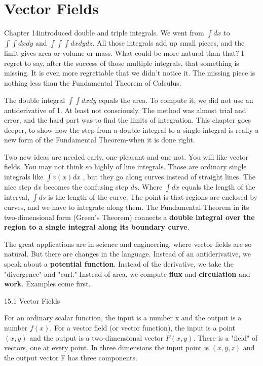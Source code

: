 \section{Vector Fields}\label{sec:vector_fields}
Chapter 14introduced double and triple integrals. We went from $\int dx$ to $\int \int  dx dy$ and
$\int \int \int dx dy dz$. All those integrals add up small pieces, and the limit gives area or volume
or mass. What could be more natural than that? I regret to say, after the success of
those multiple integrals, that something is missing. It is even more regrettable that
we didn't notice it. The missing piece is nothing less than the Fundamental Theorem
of Calculus.

The double integral $\int \int dx dy$ equals the area. To compute it, we did not use an
antiderivative of 1. At least not consciously. The method was almost trial and error,
and the hard part was to find the limits of integration. This chapter goes deeper, to
show how the step from a double integral to a single integral is really a new form of
the Fundamental Theorem-when it is done right.

Two new ideas are needed early, one pleasant and one not. You will like vector
fields. You may not think so highly of line integrals. Those are ordinary single integrals
like $\int v(x) dx$ , but they go along curves instead of straight lines. The nice step $dx$
becomes the confusing step $ds$. Where $\int dx$ equals the length of the interval, $\int  ds$ is
the length of the curve. The point is that regions are enclosed by curves, and we have
to integrate along them. The Fundamental Theorem in its two-dimensional form
(Green's Theorem) connects a \textbf{double integral over the region to a single integral along
its boundary curve}.

The great applications are in science and engineering, where vector fields are so
natural. But there are changes in the language. Instead of an antiderivative, we speak
about a \textbf{potential function}. Instead of the derivative, we take the "divergence" and
"curl." Instead of area, we compute \textbf{flux} and \textbf{circulation} and \textbf{work}. Examples come
first.

15.1 Vector Fields

For an ordinary scalar function, the input is a number x and the output is a number
$f(x)$. For a vector field (or vector function), the input is a point $(x, y)$ and the output
is a two-dimensional vector $F(x, y)$. There is a "field" of vectors, one at every point.
In three dimensions the input point is $(x, y, z)$ and the output vector F has three
components.

